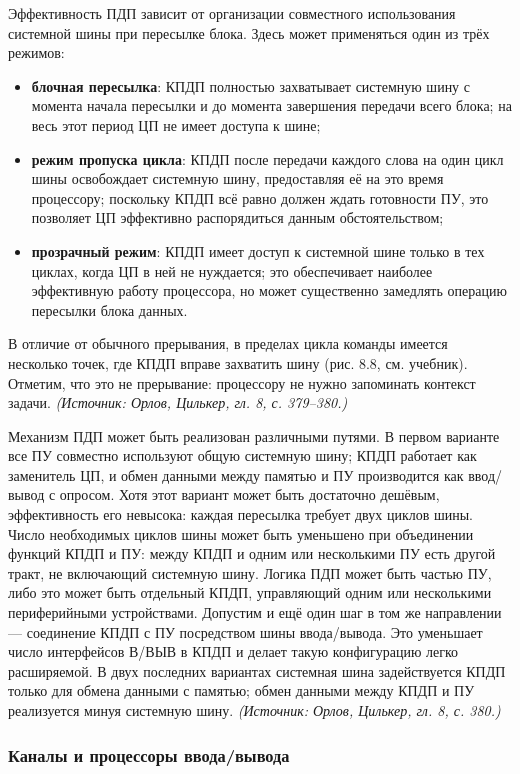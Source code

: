 \documentclass[a4paper,12pt]{article}
\begin{document}
Эффективность ПДП зависит от организации совместного использования системной шины при пересылке блока. Здесь может применяться один из трёх режимов:
\begin{itemize}
\item \textbf{блочная пересылка}: КПДП полностью захватывает системную шину с момента начала пересылки и до момента завершения передачи всего блока; на весь этот период ЦП не имеет доступа к шине;
\item \textbf{режим пропуска цикла}: КПДП после передачи каждого слова на один цикл шины освобождает системную шину, предоставляя её на это время процессору; поскольку КПДП всё равно должен ждать готовности ПУ, это позволяет ЦП эффективно распорядиться данным обстоятельством;
\item \textbf{прозрачный режим}: КПДП имеет доступ к системной шине только в тех циклах, когда ЦП в ней не нуждается; это обеспечивает наиболее эффективную работу процессора, но может существенно замедлять операцию пересылки блока данных.
\end{itemize}
В отличие от обычного прерывания, в пределах цикла команды имеется несколько точек, где КПДП вправе захватить шину (рис. 8.8, см. учебник). Отметим, что это не прерывание: процессору не нужно запоминать контекст задачи.
\textit{(Источник: Орлов, Цилькер, гл. 8, с. 379--380.)}

Механизм ПДП может быть реализован различными путями. В первом варианте все ПУ совместно используют общую системную шину; КПДП работает как заменитель ЦП, и обмен данными между памятью и ПУ производится как ввод/вывод с опросом. Хотя этот вариант может быть достаточно дешёвым, эффективность его невысока: каждая пересылка требует двух циклов шины. Число необходимых циклов шины может быть уменьшено при объединении функций КПДП и ПУ: между КПДП и одним или несколькими ПУ есть другой тракт, не включающий системную шину. Логика ПДП может быть частью ПУ, либо это может быть отдельный КПДП, управляющий одним или несколькими периферийными устройствами. Допустим и ещё один шаг в том же направлении — соединение КПДП с ПУ посредством шины ввода/вывода. Это уменьшает число интерфейсов В/ВЫВ в КПДП и делает такую конфигурацию легко расширяемой. В двух последних вариантах системная шина задействуется КПДП только для обмена данными с памятью; обмен данными между КПДП и ПУ реализуется минуя системную шину.
\textit{(Источник: Орлов, Цилькер, гл. 8, с. 380.)}

\subsubsection{Каналы и процессоры ввода/вывода}
\end{document}
